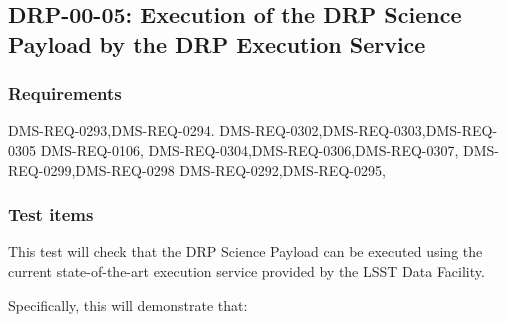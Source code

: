 \subsection{DRP-00-05: Execution of the DRP Science Payload by the DRP Execution Service}
\label{drp-00-05}

\subsubsection{Requirements}

%
DMS-REQ-0293,DMS-REQ-0294.
DMS-REQ-0302,DMS-REQ-0303,DMS-REQ-0305
%
DMS-REQ-0106,
DMS-REQ-0304,DMS-REQ-0306,DMS-REQ-0307,
DMS-REQ-0299,DMS-REQ-0298
DMS-REQ-0292,DMS-REQ-0295,

\subsubsection{Test items}

This test will check that the DRP Science Payload can be executed using the current state-of-the-art execution service provided by the LSST Data Facility.

Specifically, this will demonstrate that:

